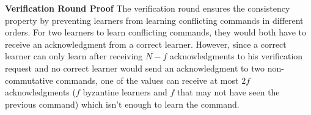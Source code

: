 \textbf{Verification Round Proof} The verification round ensures the consistency property by preventing learners from learning conflicting commands in different orders. For two learners to learn conflicting commands, they would both have to receive an acknowledgment from a correct learner. However, since a correct learner can only learn after receiving $N-f$ acknowledgments to his verification request and no correct learner would send an acknowledgment to two non-commutative commands, one of the values can receive at most $2f$ acknowledgments ($f$ byzantine learners and $f$ that may not have seen the previous command) which isn't enough to learn the command.\par